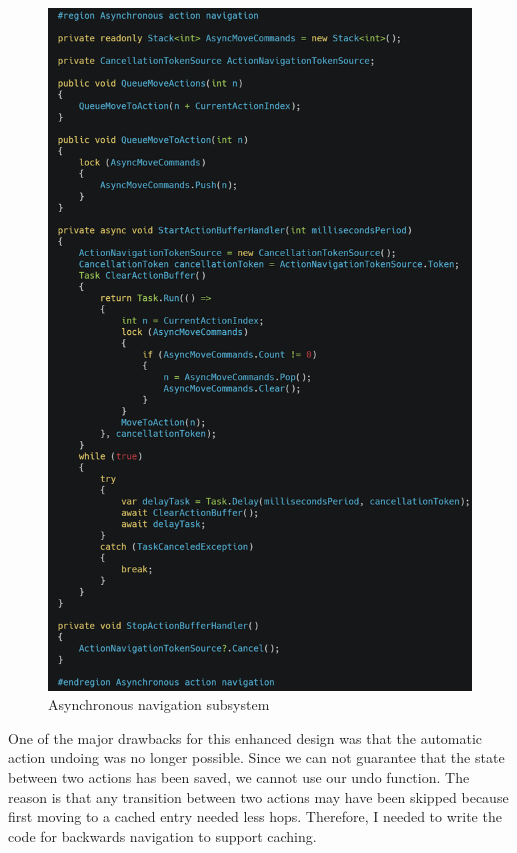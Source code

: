 \begin{figure}
\caption{Asynchronous navigation subsystem}
\label{async.navigation}
\includegraphics[width=\textwidth]{figures/async-navigation.png}
\end{figure}

One of the major drawbacks for this enhanced design was that the automatic action undoing was no longer possible. Since we can not guarantee that the state between two actions has been saved, we cannot use our undo function. The reason is that any transition between two actions may have been skipped because first moving to a cached entry needed less hops. Therefore, I needed to write the code for backwards navigation to support caching.

